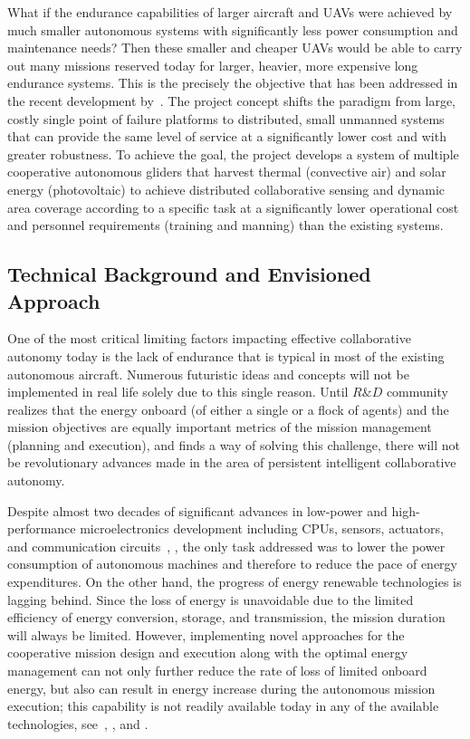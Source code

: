 \documentclass{ifacconf}
\begin{document}
What if the endurance capabilities of larger aircraft and UAVs were achieved by much smaller autonomous systems with significantly less power consumption and maintenance needs? Then these smaller and cheaper UAVs would be able to carry out many missions reserved today for larger, heavier, more expensive long endurance systems. This is the precisely the objective that has been addressed in the recent development by~\cite{AKlass_JGCD:2012,AKlass_CDC:2012}. The project concept shifts the paradigm from large, costly single point of failure platforms to distributed, small unmanned systems that can provide the same level of service at a significantly lower cost and with greater robustness. To achieve the goal, the project develops a system of multiple cooperative autonomous gliders that harvest thermal (convective air) and solar energy (photovoltaic) to achieve distributed collaborative sensing and dynamic area coverage according to a specific task at a significantly lower operational cost and personnel requirements (training and manning) than the existing systems.

\subsection{Technical Background and Envisioned Approach}

One of the most critical limiting factors impacting effective collaborative autonomy today is the lack of endurance that is typical in most of the existing autonomous aircraft. Numerous futuristic ideas and concepts will not be implemented in real life solely due to this single reason. Until $R\&D$ community realizes that the energy onboard (of either a single or a flock of agents) and the mission objectives are equally important metrics of the mission management (planning and execution), and finds a way of solving this challenge, there will not be revolutionary advances made in the area of persistent intelligent collaborative autonomy.

Despite almost two decades of significant advances in low-power and high-performance microelectronics development including CPUs, sensors, actuators, and communication circuits~\cite{Tong:1995}, \cite{Singh:2010}, the only task addressed was to lower the power consumption of autonomous machines and therefore to reduce the pace of energy expenditures. On the other hand, the progress of energy renewable technologies is lagging behind. Since the loss of energy is unavoidable due to the limited efficiency of energy conversion, storage, and transmission, the mission duration will always be limited. However, implementing novel approaches for the cooperative mission design and execution along with the optimal energy management can not only further reduce the rate of loss of limited onboard energy, but also can result in energy increase during the autonomous mission execution; this capability is not readily available today in any of the available technologies, see~\cite{Siciliano:2008}, \cite{Martinez:2008}, and \cite{Nonami:2013}.
\end{document}
